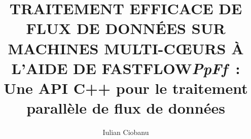 \documentclass[12pt]{latex/memoireuqam1.3}          %
\begin{document}

\title{TRAITEMENT EFFICACE DE FLUX DE DONN\'EES SUR MACHINES MULTI-C\OE{}URS \`A L'AIDE DE FASTFLOW}

\title{\emph{P\lowercase{p}F\lowercase{f}}~: Une API C++ pour le traitement parall\`ele de flux de donn\'ees}

\author{Iulian Ciobanu}
\uqammemoire
{}

\thispagestyle{empty}
\maketitle


\renewcommand \bibname{BIBLIOGRAPHIE}

\renewcommand \listfigurename{LISTE DES FIGURES}
\renewcommand \listtablename{LISTE DES TABLEAUX}
\renewcommand \lstlistlistingname{LISTE DES LISTINGS}
\renewcommand \appendixname{ANNEXE}
\renewcommand \figurename{Figure}
\renewcommand \tablename{Tableau}

\addtocounter{page}{1}





\setcounter{tocdepth}{2}

\tableofcontents
\listoffigures
\listoftables

\lstlistoflistings
{}




\end{document}
